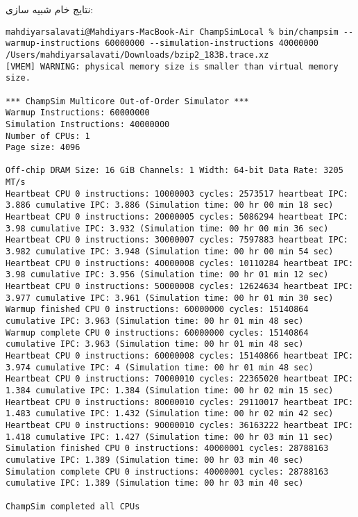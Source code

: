 \documentclass[17pt]{article}
\begin{document}
نتایج خام شبیه سازی:

\begin{LTR}
\begin{lstlisting}[basicstyle=\tiny\ttfamily]
mahdiyarsalavati@Mahdiyars-MacBook-Air ChampSimLocal % bin/champsim --warmup-instructions 60000000 --simulation-instructions 40000000 /Users/mahdiyarsalavati/Downloads/bzip2_183B.trace.xz
[VMEM] WARNING: physical memory size is smaller than virtual memory size.

*** ChampSim Multicore Out-of-Order Simulator ***
Warmup Instructions: 60000000
Simulation Instructions: 40000000
Number of CPUs: 1
Page size: 4096

Off-chip DRAM Size: 16 GiB Channels: 1 Width: 64-bit Data Rate: 3205 MT/s
Heartbeat CPU 0 instructions: 10000003 cycles: 2573517 heartbeat IPC: 3.886 cumulative IPC: 3.886 (Simulation time: 00 hr 00 min 18 sec)
Heartbeat CPU 0 instructions: 20000005 cycles: 5086294 heartbeat IPC: 3.98 cumulative IPC: 3.932 (Simulation time: 00 hr 00 min 36 sec)
Heartbeat CPU 0 instructions: 30000007 cycles: 7597883 heartbeat IPC: 3.982 cumulative IPC: 3.948 (Simulation time: 00 hr 00 min 54 sec)
Heartbeat CPU 0 instructions: 40000008 cycles: 10110284 heartbeat IPC: 3.98 cumulative IPC: 3.956 (Simulation time: 00 hr 01 min 12 sec)
Heartbeat CPU 0 instructions: 50000008 cycles: 12624634 heartbeat IPC: 3.977 cumulative IPC: 3.961 (Simulation time: 00 hr 01 min 30 sec)
Warmup finished CPU 0 instructions: 60000000 cycles: 15140864 cumulative IPC: 3.963 (Simulation time: 00 hr 01 min 48 sec)
Warmup complete CPU 0 instructions: 60000000 cycles: 15140864 cumulative IPC: 3.963 (Simulation time: 00 hr 01 min 48 sec)
Heartbeat CPU 0 instructions: 60000008 cycles: 15140866 heartbeat IPC: 3.974 cumulative IPC: 4 (Simulation time: 00 hr 01 min 48 sec)
Heartbeat CPU 0 instructions: 70000010 cycles: 22365020 heartbeat IPC: 1.384 cumulative IPC: 1.384 (Simulation time: 00 hr 02 min 15 sec)
Heartbeat CPU 0 instructions: 80000010 cycles: 29110017 heartbeat IPC: 1.483 cumulative IPC: 1.432 (Simulation time: 00 hr 02 min 42 sec)
Heartbeat CPU 0 instructions: 90000010 cycles: 36163222 heartbeat IPC: 1.418 cumulative IPC: 1.427 (Simulation time: 00 hr 03 min 11 sec)
Simulation finished CPU 0 instructions: 40000001 cycles: 28788163 cumulative IPC: 1.389 (Simulation time: 00 hr 03 min 40 sec)
Simulation complete CPU 0 instructions: 40000001 cycles: 28788163 cumulative IPC: 1.389 (Simulation time: 00 hr 03 min 40 sec)

ChampSim completed all CPUs


\end{lstlisting}
\end{LTR}
\end{document}

